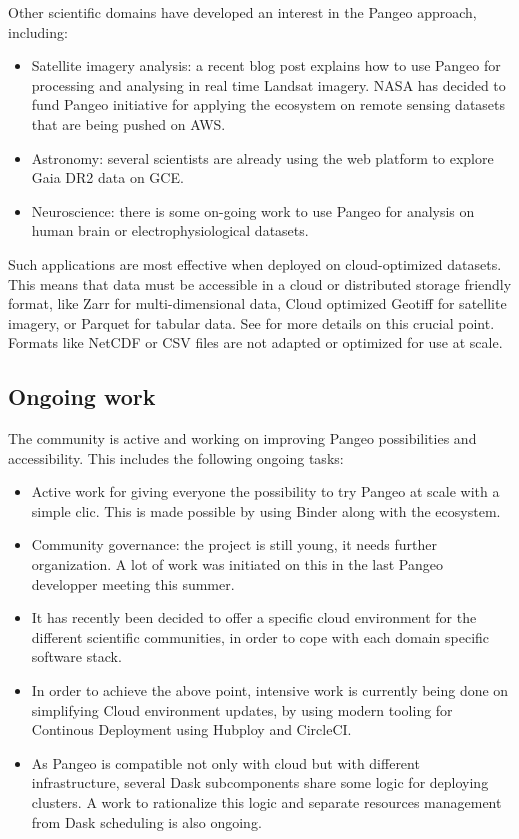 \documentclass{article}
\begin{document}
Other scientific domains have developed an interest in the Pangeo approach, including:
\begin{itemize}
\item Satellite imagery analysis: a recent blog post\cite{b6} explains how to use Pangeo for processing and analysing in real time Landsat imagery. NASA has decided to fund Pangeo initiative for applying the ecosystem on remote sensing datasets that are being pushed on AWS.
\item Astronomy: several scientists are already using the web platform to explore Gaia DR2 data on GCE.
\item Neuroscience: there is some on-going work to use Pangeo for analysis on human brain or electrophysiological datasets.
\end{itemize}

Such applications are most effective when deployed on cloud-optimized datasets. This means that data must be accessible in a cloud or distributed storage friendly format, like Zarr for multi-dimensional data, Cloud optimized Geotiff for satellite imagery, or Parquet for tabular data. See \cite{b7} for more details on this crucial point. Formats like NetCDF or CSV files are not adapted or optimized for use at scale.

\subsection{Ongoing work}
\label{ssec:ongowork}

The community is active and working on improving Pangeo possibilities and accessibility. This includes the following ongoing tasks:\begin{itemize}
\item Active work for giving everyone the possibility to try Pangeo at scale with a simple clic. This is made possible by using Binder along with the ecosystem\cite{b8}.
\item Community governance: the project is still young, it needs further organization. A lot of work was initiated on this in the last Pangeo developper meeting this summer.
\item It has recently been decided to offer a specific cloud environment for the different scientific communities, in order to cope with each domain specific software stack.
\item In order to achieve the above point, intensive work is currently being done on simplifying Cloud environment updates, by using modern tooling for Continous Deployment using Hubploy and CircleCI.
\item As Pangeo is compatible not only with cloud but with different infrastructure, several Dask subcomponents share some logic for deploying clusters. A work to rationalize this logic and separate resources management from Dask scheduling is also ongoing.
\end{itemize}
\end{document}
